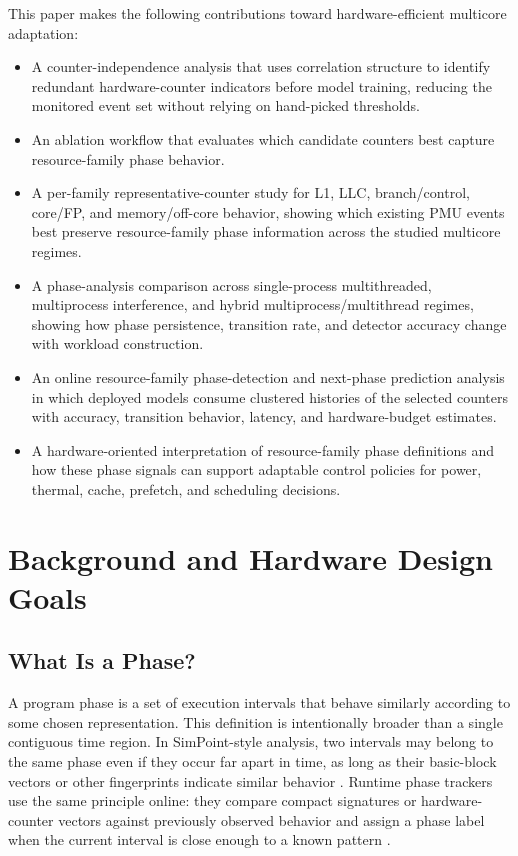 \documentclass[10pt,twocolumn]{article}
\begin{document}
This paper makes the following contributions toward hardware-efficient multicore adaptation:
\begin{itemize}
  \item A counter-independence analysis that uses correlation structure to identify redundant hardware-counter indicators before model training, reducing the monitored event set without relying on hand-picked thresholds.
  \item An ablation workflow that evaluates which candidate counters best capture resource-family phase behavior.
  \item A per-family representative-counter study for L1, LLC, branch/control, core/FP, and memory/off-core behavior, showing which existing PMU events best preserve resource-family phase information across the studied multicore regimes.
  \item A phase-analysis comparison across single-process multithreaded, multiprocess interference, and hybrid multiprocess/multithread regimes, showing how phase persistence, transition rate, and detector accuracy change with workload construction.
  \item An online resource-family phase-detection and next-phase prediction analysis in which deployed models consume clustered histories of the selected counters with accuracy, transition behavior, latency, and hardware-budget estimates.
  \item A hardware-oriented interpretation of resource-family phase definitions and how these phase signals can support adaptable control policies for power, thermal, cache, prefetch, and scheduling decisions.
\end{itemize}

\section{Background and Hardware Design Goals}

\subsection{What Is a Phase?}

A program phase is a set of execution intervals that behave similarly according to some chosen representation.
This definition is intentionally broader than a single contiguous time region.
In SimPoint-style analysis, two intervals may belong to the same phase even if they occur far apart in time, as long as their basic-block vectors or other fingerprints indicate similar behavior \cite{sherwood2001bbda,sherwood2002simpoint,hamerly2005simpoint3}.
Runtime phase trackers use the same principle online: they compare compact signatures or hardware-counter vectors against previously observed behavior and assign a phase label when the current interval is close enough to a known pattern \cite{sherwood2003phase,nomani2015predicting}.
\end{document}
